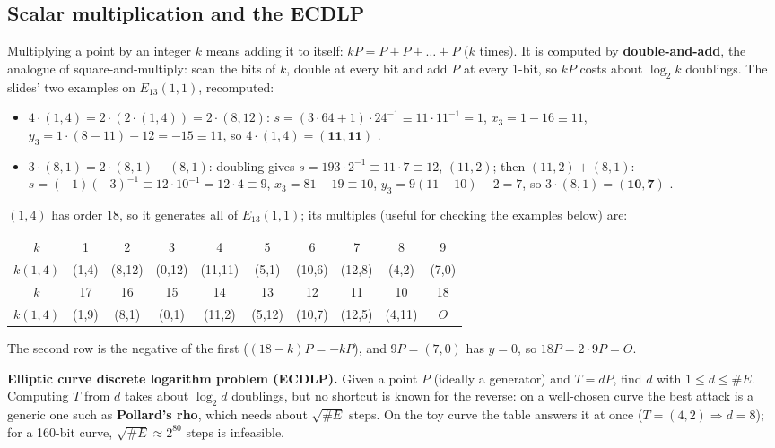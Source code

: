 \subsection{Scalar multiplication and the ECDLP \new}
Multiplying a point by an integer $k$ means adding it to itself: $kP = P + P + \dots + P$ ($k$ times). It is computed by \textbf{double-and-add}, the analogue of square-and-multiply: scan the bits of $k$, double at every bit and add $P$ at every 1-bit, so $kP$ costs about $\log_2 k$ doublings. The slides' two examples on $E_{13}(1, 1)$, recomputed:
\begin{itemize}[leftmargin=1.4em]
  \item $4 \cdot (1, 4) = 2 \cdot (2 \cdot (1, 4)) = 2 \cdot (8, 12)$: $s = (3 \cdot 64 + 1) \cdot 24^{-1} \equiv 11 \cdot 11^{-1} = 1$, $x_3 = 1 - 16 \equiv 11$, $y_3 = 1 \cdot (8 - 11) - 12 = -15 \equiv 11$, so $4 \cdot (1, 4) = \mathbf{(11, 11)}$ \checkmark.
  \item $3 \cdot (8, 1) = 2 \cdot (8, 1) + (8, 1)$: doubling gives $s = 193 \cdot 2^{-1} \equiv 11 \cdot 7 \equiv 12$, $(11, 2)$; then $(11, 2) + (8, 1)$: $s = (-1)(-3)^{-1} \equiv 12 \cdot 10^{-1} = 12 \cdot 4 \equiv 9$, $x_3 = 81 - 19 \equiv 10$, $y_3 = 9(11 - 10) - 2 = 7$, so $3 \cdot (8, 1) = \mathbf{(10, 7)}$ \checkmark.
\end{itemize}
$(1, 4)$ has order 18, so it generates all of $E_{13}(1, 1)$; its multiples (useful for checking the examples below) are:
\begin{center}\small
\begin{tabular}{@{}c|ccccccccc@{}}
\toprule
$k$ & 1 & 2 & 3 & 4 & 5 & 6 & 7 & 8 & 9\\
$k(1,4)$ & (1,4) & (8,12) & (0,12) & (11,11) & (5,1) & (10,6) & (12,8) & (4,2) & (7,0)\\
\midrule
$k$ & 17 & 16 & 15 & 14 & 13 & 12 & 11 & 10 & 18\\
$k(1,4)$ & (1,9) & (8,1) & (0,1) & (11,2) & (5,12) & (10,7) & (12,5) & (4,11) & $O$\\
\bottomrule
\end{tabular}
\end{center}
The second row is the negative of the first ($(18 - k)P = -kP$), and $9P = (7, 0)$ has $y = 0$, so $18P = 2 \cdot 9P = O$.

\textbf{Elliptic curve discrete logarithm problem (ECDLP).} Given a point $P$ (ideally a generator) and $T = dP$, find $d$ with $1 \le d \le \#E$. Computing $T$ from $d$ takes about $\log_2 d$ doublings, but no shortcut is known for the reverse: on a well-chosen curve the best attack is a generic one such as \textbf{Pollard's rho}, which needs about $\sqrt{\#E}$ steps. On the toy curve the table answers it at once ($T = (4, 2) \Rightarrow d = 8$); for a 160-bit curve, $\sqrt{\#E} \approx 2^{80}$ steps is infeasible.

